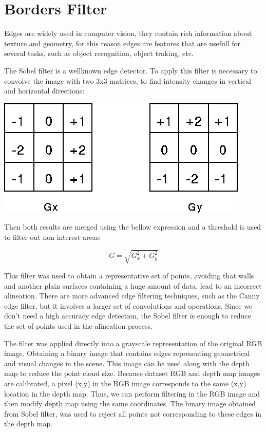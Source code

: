 \section{Borders Filter}

Edges are widely used in computer vision, they contain rich information about texture 
and geometry, for this reason edges are features that are usefull for several tasks, 
such as object recognition, object traking, etc.


The Sobel filter is a wellknown edge detector. To apply this filter is necessary to 
convolve the image with two 3x3 matrices, to find intensity changes in vertical and 
horizontal directions:

\begin{center}
\includegraphics[scale=0.35]{images/sobel}
\end{center}

Then both results are merged using the bellow expression and a threshold is used to filter out non interest areas:

\begin{equation}
G = \sqrt{G_x^2+ G_y^2}
\label{eq:sobelGrad}
\end{equation}

This filter was used to obtain a representative set of points, avoiding that walls and another 
plain surfaces containing a huge amount of data, lead to an incorrect alineation.
There are more advanced edge filtering techniques, such as the Canny edge filter, but it involves 
a larger set of convolutions and operations. Since we don't need a high accuracy edge detection, the Sobel 
filter is enough to reduce the set of points used in the alineation process. 

The filter was applied directly into a grayscale representation of the original RGB image. Obtaining a binary image 
that contains edges representing geometrical and visual changes in the scene. 
This image can be used along with the depth map to reduce the point cloud size. Because dataset RGB and depth map images are 
calibrated, a pixel (x,y) in the RGB image corresponds to the same (x,y) location in the depth map. Thus, we can perform filtering 
in the RGB image and then modify depth map using the same coordinates. The binary image obtained from Sobel filter, was used 
to reject all points not corresponding
to these edges in the depth map. 

